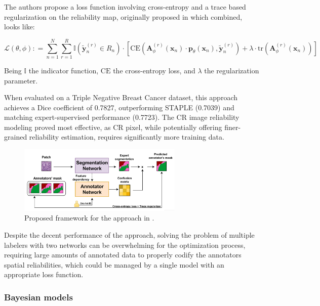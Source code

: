 The authors propose a loss function involving cross-entropy and a trace based
regularization on the reliability map, originally proposed in
\cite{ZhangEtAl2020} which combined, looks like:

\begin{equation}
  \mathcal{L}(\theta, \phi) : = \sum_{n=1}^{N} \sum_{r=1}^{R}
  \mathbb{I} \left( \tilde{\mathbf{y}}_{n}^{(r)} \in R_n \right)
  \cdot \left[ \text{CE} \left( \mathbf{A}_{\phi}^{(r)}
      (\mathbf{x}_n) \cdot \mathbf{p}_{\theta} (\mathbf{x}_n),
    \tilde{\mathbf{y}}_{n}^{(r)} \right) + \lambda \cdot \text{tr}
  \left( \mathbf{A}_{\phi}^{(r)} (\mathbf{x}_n) \right) \right]
\end{equation}

Being $\mathbb{I}$ the indicator function, $\text{CE}$ the cross-entropy loss,
and $\lambda$ the regularization parameter.

When evaluated on a Triple Negative Breast Cancer dataset, this
approach achieves a Dice coefficient of 0.7827, outperforming STAPLE
(0.7039) and matching expert-supervised performance (0.7723). The CR
image reliability modeling proved most effective, as CR pixel, while
potentially offering finer-grained reliability estimation, requires
significantly more training data.

\begin{figure}
  \centering
  \includegraphics[width=0.7\textwidth]{Cap1/Figures/lopez_2024_proposed_framework.png}
  \caption{Proposed framework for the approach in \cite{LopezEtAl2024}.}
  \label{fig:lopez_2024_proposed_framework}
\end{figure}

Despite the decent performance of the approach, solving the problem
of multiple labelers with two networks can be overwhelming for the
optimization process, requiring large amounts of annotated data to
properly codify the annotators spatial reliabilities, which could be
managed by a single model with an appropriate loss function.
\subsubsection{Bayesian models}

